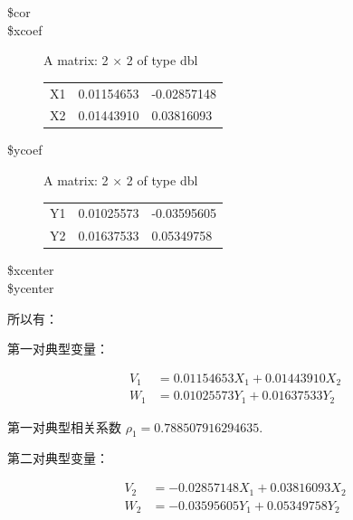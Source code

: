\documentclass[11pt]{article}
\begin{document}
    \begin{description}
\item[\$cor] 

\item[\$xcoef] A matrix: 2 × 2 of type dbl
\begin{tabular}{r|ll}
	X1 & 0.01154653 & -0.02857148\\
	X2 & 0.01443910 &  0.03816093\\
\end{tabular}

\item[\$ycoef] A matrix: 2 × 2 of type dbl
\begin{tabular}{r|ll}
	Y1 & 0.01025573 & -0.03595605\\
	Y2 & 0.01637533 &  0.05349758\\
\end{tabular}

\item[\$xcenter] 

\item[\$ycenter] 

\end{description}


    
    所以有：

第一对典型变量：

\[
\begin{aligned}
V_1 &= 0.01154653 X_1 + 0.01443910 X_2 \\
W_1 &= 0.01025573 Y_1 + 0.01637533 Y_2
\end{aligned}
\]

第一对典型相关系数 \(\rho_1 = 0.788507916294635\).

第二对典型变量：

\[
\begin{aligned}
V_2 &= -0.02857148 X_1 + 0.03816093 X_2 \\
W_2 &= -0.03595605 Y_1 + 0.05349758 Y_2
\end{aligned}
\]
\end{document}
